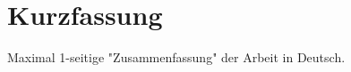 \chapter{Kurzfassung}

\begin{german}
Maximal 1-seitige "Zusammenfassung" der Arbeit in Deutsch.
\end{german}

